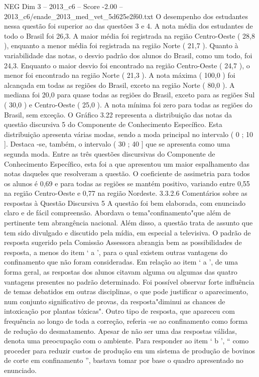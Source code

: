 \begin{textsample}{NEG Dim 3 – 2013\_c6 – Score -2.00 – 2013\_c6/enade\_2013\_med\_vet\_5d625e2f60.txt}
O desempenho dos estudantes nessa questão foi superior ao das questões 3 e 4.
A nota média dos estudantes de todo o Brasil foi 26,3.
A maior média foi registrada na região Centro-Oeste ( 28,8 ), enquanto a menor média foi registrada na região Norte ( 21,7 ).
Quanto à variabilidade das notas, o desvio padrão dos alunos do Brasil, como um todo, foi 24,3.
Enquanto o maior desvio foi encontrado na região Centro-Oeste ( 24,7 ), o menor foi encontrado na região Norte ( 21,3 ).
A nota máxima ( 100,0 ) foi alcançada em todas as regiões do Brasil, exceto na região Norte ( 80,0 ).
A mediana foi 20,0 para quase todas as regiões do Brasil, exceto para as regiões Sul ( 30,0 ) e Centro-Oeste ( 25,0 ).
A nota mínima foi zero para todas as regiões do Brasil, sem exceção.
O Gráfico 3.22 representa a distribuição das notas da questão discursiva 5 do Componente de Conhecimento Específico.
Esta distribuição apresenta várias modas, sendo a moda principal no intervalo ( 0 ; 10 ].
Destaca -se, também, o intervalo ( 30 ; 40 ] que se apresenta como uma segunda moda.
Entre as três questões discursivas do Componente de Conhecimento Específico, esta foi a que apresentou um maior espalhamento das notas daqueles que resolveram a questão.
O coeficiente de assimetria para todos os alunos é 0,69 e para todas as regiões se mantém positivo, variando entre 0,55 na região Centro-Oeste e 0,77 na região Nordeste. 3.3.2.6 Comentários sobre as respostas à Questão Discursiva 5 A questão foi bem elaborada, com enunciado claro e de fácil compreensão.
Abordava o tema"confinamento"que além de pertinente tem abrangência nacional.
Além disso, a questão trata de assunto que tem sido divulgado e discutido pela mídia, em especial a televisiva.
O padrão de resposta sugerido pela Comissão Assessora abrangia bem as possibilidades de resposta, a menos do item ‘ a ’, para o qual existem outras vantagens do confinamento que não foram consideradas.
Em relação ao item ‘ a ’, de uma forma geral, as respostas dos alunos citavam alguma ou algumas das quatro vantagens presentes no padrão determinado.
Foi possível observar forte influência de temas debatidos em outras disciplinas, o que pode justificar o aparecimento, num conjunto significativo de provas, da resposta"diminui as chances de intoxicação por plantas tóxicas".
Outro tipo de resposta, que apareceu com frequência ao longo de toda a correção, referia -se ao confinamento como forma de redução do desmatamento.
Apesar de não ser uma das respostas válidas, denota uma preocupação com o ambiente.
Para responder ao item ‘ b ’, “ como proceder para reduzir custos de produção em um sistema de produção de bovinos de corte em confinamento ”, bastava tomar por base o quadro apresentado no enunciado.

\end{textsample}
